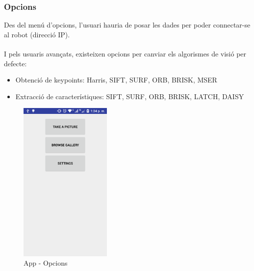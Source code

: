 	\subsubsection{Opcions}
		Des del menú d'opcions, l'usuari hauria de posar les dades per poder connectar-se al robot (direcció IP).\\\\
		I pels usuaris avançats, existeixen opcions per canviar els algorismes de visió per defecte:\\
		\begin{itemize}
			\item{Obtenció de keypoints: Harris, SIFT, SURF, ORB, BRISK, MSER}
			\item{Extracció de característiques: SIFT, SURF, ORB, BRISK, LATCH, DAISY\\}
		\end{itemize}
		\begin{figure}[H]
			\centering
			\includegraphics[width=0.4\textwidth]{images/options}
			\caption{App - Opcions}
		\end{figure}

